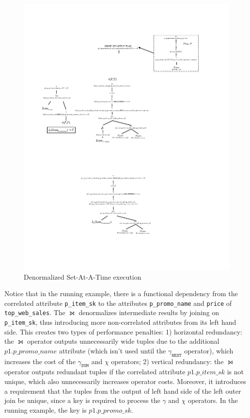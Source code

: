 \begin{figure}[h]
\centering
\caption{Denormalized Set-At-A-Time execution \label{fig:DSAAT_example}}
\includegraphics[width=1.05 \linewidth]{images/DSAAT_running-example.pdf}
\end{figure}

Notice that in the running example, there is a functional dependency from the correlated attribute \texttt{p\_item\_sk} to the attributes \texttt{p\_promo\_name} and \texttt{price} of \texttt{top\_web\_sales}. The $\leftouterjoin$ denormalizes intermediate results by joining on \texttt{p\_item\_sk}, thus introducing more non-correlated attributes from its left hand side. This creates two types of performance penalties: 1) horizontal redundancy: the $\leftouterjoin$ operator outputs unnecessarily wide tuples due to the additional $p1.p\_promo\_name$ attribute (which isn't used until the $\gamma_\texttt{NEST}$ operator), which increases the cost of the $\gamma_\texttt{SUM}$ and $\chi$ operators; 2) vertical redundancy: the $\leftouterjoin$ operator outputs redundant tuples if the correlated attribute $p1.p\_item\_sk$ is not unique, which also unnecessarily increases operator costs. Moreover, it introduces a requirement that the tuples from the output of left hand side of the left outer join be unique, since a key is required to process  the $\gamma$ and $\chi$ operators. In the running example, the key is $p1.p\_promo\_sk$.

